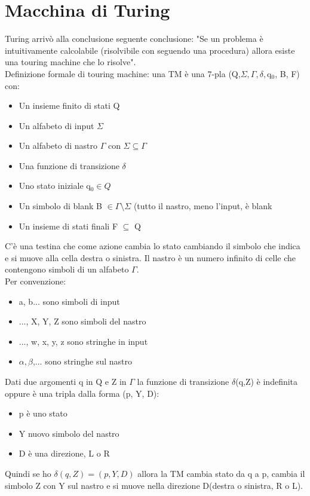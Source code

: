 \documentclass[12pt]{article}
\begin{document}
\section{Macchina di Turing} 
Turing arrivò alla conclusione seguente conclusione: "Se un problema è intuitivamente calcolabile (risolvibile con seguendo una procedura) allora esiste una touring machine che lo risolve".
\\ Definizione formale di touring machine: una TM è una 7-pla (Q,$\Sigma, \Gamma, \delta,$q$_0$, B, F) con: 
\begin{itemize}
    \item Un insieme finito di stati Q
    \item Un alfabeto di input $\Sigma$
    \item Un alfabeto di nastro $\Gamma$ con $\Sigma \subseteq \Gamma$
    \item Una funzione di transizione $\delta$
    \item Uno stato iniziale q$_0 \in Q$ 
    \item Un simbolo di blank B $\in \Gamma \setminus \Sigma$ (tutto il nastro, meno l'input, è blank
    \item Un insieme di stati finali F $\subseteq$ Q
\end{itemize}
C'è una testina che come azione cambia lo stato cambiando il simbolo che indica e si muove alla cella destra o sinistra. Il nastro è un numero infinito di celle che contengono simboli di un alfabeto $\Gamma$.
\\ Per convenzione: 
\begin{itemize}
    \item a, b... sono simboli di input
    \item ..., X, Y, Z sono simboli del nastro
    \item ..., w, x, y, z sono stringhe in input
    \item $\alpha, \beta$,... sono stringhe sul nastro
\end{itemize}
Dati due argomenti q in Q e Z in $\Gamma$ la funzione di transizione $\delta$(q,Z) è indefinita oppure è una tripla dalla forma (p, Y, D): 
\begin{itemize}
    \item p è uno stato
    \item Y nuovo simbolo del nastro 
    \item D è una direzione, L o R
\end{itemize}
Quindi se ho $\delta(q,Z) = (p,Y,D)$ allora la TM cambia stato da q a p, cambia il simbolo Z con Y sul nastro e si muove nella direzione D(destra o sinistra, R o L).
\end{document}
